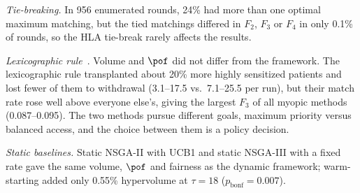 \documentclass[journal]{IEEEtran}
\begin{document}
\emph{Tie-breaking.} In 956 enumerated rounds, 24\% had more than one
optimal maximum matching, but the tied matchings differed in $F_2$, $F_3$
or $F_4$ in only 0.1\% of rounds, so the HLA tie-break rarely affects the
results.

\emph{Lexicographic rule}~\cite{dickerson2014price}. Volume and $\pof$ did
not differ from the framework. The lexicographic rule transplanted about
20\% more highly sensitized patients and lost fewer of them to withdrawal
(3.1--17.5 vs.\ 7.1--25.5 per run), but their match rate rose well above
everyone else's, giving the largest $F_3$ of all myopic methods
(0.087--0.095). The two methods pursue different goals, maximum priority
versus balanced access, and the choice between them is a policy decision.

\emph{Static baselines.} Static NSGA-II with UCB1 and static NSGA-III with
a fixed rate gave the same volume, $\pof$ and fairness as the dynamic
framework; warm-starting added only 0.55\% hypervolume at $\tau = 18$
($p_{\mathrm{bonf}} = 0.007$).
\end{document}
